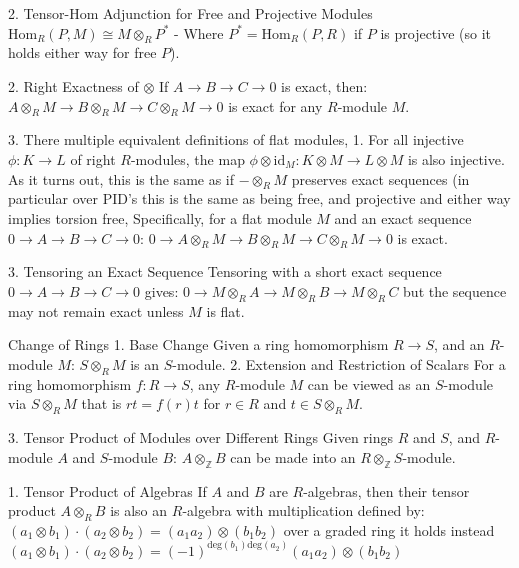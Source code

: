2. Tensor-Hom Adjunction for Free and Projective Modules
\(
\text{Hom}_R(P, M) \cong M \otimes_R P^*
\)
- Where \(P^* = \text{Hom}_R(P, R)\) if \(P\) is projective (so it holds either way for free \( P \)).

2. Right Exactness of \(\otimes\)
If \(A \rightarrow B \rightarrow C \rightarrow 0\) is exact, then:
\(
A \otimes_R M \rightarrow B \otimes_R M \rightarrow C \otimes_R M \rightarrow 0
\)
is exact for any \(R\)-module \(M\).

3.
There multiple equivalent definitions of flat modules,
1. For all injective \( \phi : K \to L \) of right \( R \)-modules, the map \( \phi \otimes \text{id}_{M} : K \otimes M \to L \otimes M \)
is also injective. As it turns out, this is the same as if \(- \otimes_R M\) preserves exact sequences (in particular over PID's this is the same
as being free, and projective and either way implies torsion free,
Specifically, for a flat module \(M\) and an exact sequence \(0 \rightarrow A \rightarrow B \rightarrow C \rightarrow 0\):
 \(
 0 \rightarrow A \otimes_R M \rightarrow B \otimes_R M \rightarrow C \otimes_R M \rightarrow 0
 \)
 is exact.

3. Tensoring an Exact Sequence
Tensoring with a short exact sequence \(0 \rightarrow A \rightarrow B \rightarrow C \rightarrow 0\) gives:
 \(
 0 \rightarrow M \otimes_R A \rightarrow M \otimes_R B \rightarrow M \otimes_R C
 \)
 but the sequence may not remain exact unless \(M\) is flat.

Change of Rings
1. Base Change
Given a ring homomorphism \(R \rightarrow S\), and an \(R\)-module \(M\):
\(
S \otimes_R M
\)
is an \(S\)-module.
2. Extension and Restriction of Scalars
For a ring homomorphism \(f : R \rightarrow S\), any \(R\)-module \(M\) can be viewed as an \(S\)-module via \(S \otimes_R M\)
that is \( rt = f(r)t \) for \( r \in R \) and \( t \in S \otimes_R M \).

3. Tensor Product of Modules over Different Rings
Given rings \(R\) and \(S\), and \(R\)-module \(A\) and \(S\)-module \(B\):
\(
A \otimes_\mathbb{Z} B
\)
can be made into an \(R \otimes_\mathbb{Z} S\)-module.


1. Tensor Product of Algebras
If \(A\) and \(B\) are \(R\)-algebras, then their tensor product \(A \otimes_R B\) is also an \(R\)-algebra with multiplication defined by:
\(
(a_1 \otimes b_1) \cdot (a_2 \otimes b_2) = (a_1 a_2) \otimes (b_1 b_2)
\)
over a graded ring it holds instead
\(
(a_1 \otimes b_1) \cdot (a_2 \otimes b_2) = (-1)^{\text{deg}(b_1)\text{deg}(a_2)}(a_1 a_2) \otimes (b_1 b_2)
\)


